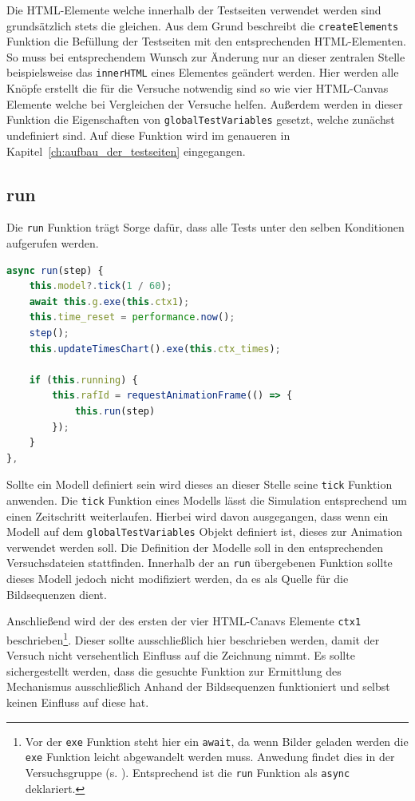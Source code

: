Die HTML-Elemente welche innerhalb der Testseiten verwendet werden sind grundsätzlich stets die gleichen.
Aus dem Grund beschreibt die \lstinline{createElements} Funktion die Befüllung der Testseiten mit den entsprechenden HTML-Elementen.
So muss bei entsprechendem Wunsch zur Änderung nur an dieser zentralen Stelle beispielsweise das \lstinline{innerHTML} eines Elementes geändert werden.
Hier werden alle Knöpfe erstellt die für die Versuche notwendig sind so wie vier HTML-Canvas Elemente welche bei Vergleichen der Versuche helfen.
Au{\ss}erdem werden in dieser Funktion die Eigenschaften von \lstinline{globalTestVariables} gesetzt, welche zunächst undefiniert sind.
Auf diese Funktion wird im genaueren in Kapitel~\ref{ch:aufbau_der_testseiten} eingegangen.

\subsection{run}\label{ch:gtv_run}

Die \lstinline{run} Funktion trägt Sorge dafür, dass alle Tests unter den selben Konditionen aufgerufen werden.

\begin{lstlisting}[language=JavaScript, caption={Definition der \lstinline{globalTestVariables.run} Funktion.}, label={lst:gtv_run}]
async run(step) {
    this.model?.tick(1 / 60);
    await this.g.exe(this.ctx1);
    this.time_reset = performance.now();
    step();
    this.updateTimesChart().exe(this.ctx_times);

    if (this.running) {
        this.rafId = requestAnimationFrame(() => {
            this.run(step)
        });
    }
},
\end{lstlisting}

Sollte ein  Modell definiert sein wird dieses an dieser Stelle seine \lstinline{tick} Funktion anwenden.
Die \lstinline{tick} Funktion eines  Modells lässt die Simulation entsprechend um einen Zeitschritt weiterlaufen.
Hierbei wird davon ausgegangen, dass wenn ein  Modell auf dem \lstinline{globalTestVariables} Objekt definiert ist, dieses zur Animation verwendet werden soll.
Die Definition der Modelle soll in den entsprechenden Versuchsdateien stattfinden.
Innerhalb der an \lstinline{run} übergebenen Funktion sollte dieses Modell jedoch nicht modifiziert werden, da es als Quelle für die Bildsequenzen dient.

Anschlie{\ss}end wird der  des ersten der vier HTML-Canavs Elemente \lstinline{ctx1} beschrieben\footnote{Vor der \lstinline{exe} Funktion steht hier ein \lstinline{await}, da wenn Bilder geladen werden die \lstinline{exe} Funktion leicht abgewandelt werden muss. Anwedung findet dies in der Versuchsgruppe  (s. ).
Entsprechend ist die \lstinline{run} Funktion als \lstinline{async} deklariert.}.
Dieser sollte ausschlie{\ss}lich hier beschrieben werden, damit der Versuch nicht versehentlich Einfluss auf die Zeichnung nimmt.
Es sollte sichergestellt werden, dass die gesuchte Funktion zur Ermittlung des Mechanismus ausschlie{\ss}lich Anhand der Bildsequenzen funktioniert und selbst keinen Einfluss auf diese hat.

